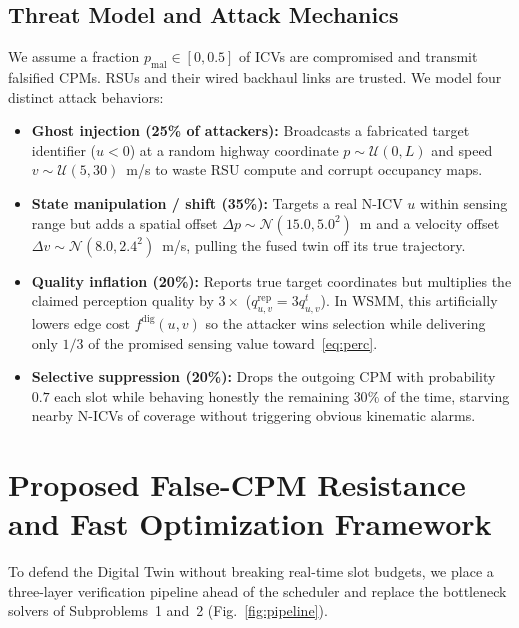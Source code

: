 \documentclass[conference]{IEEEtran}
\begin{document}
\subsection{Threat Model and Attack Mechanics}
\label{sec:threat}
We assume a fraction $p_{\mathrm{mal}}\in[0, 0.5]$ of ICVs are compromised and transmit falsified CPMs. RSUs and their wired backhaul links are trusted. We model four distinct attack behaviors:
\begin{itemize}
\item \textbf{Ghost injection (25\% of attackers):} Broadcasts a fabricated target identifier ($u < 0$) at a random highway coordinate $p\sim\mathcal{U}(0, L)$ and speed $v\sim\mathcal{U}(5, 30)$~m/s to waste RSU compute and corrupt occupancy maps.
\item \textbf{State manipulation / shift (35\%):} Targets a real N-ICV $u$ within sensing range but adds a spatial offset $\Delta p\sim\mathcal{N}(15.0, 5.0^2)$~m and a velocity offset $\Delta v\sim\mathcal{N}(8.0, 2.4^2)$~m/s, pulling the fused twin off its true trajectory.
\item \textbf{Quality inflation (20\%):} Reports true target coordinates but multiplies the claimed perception quality by $3\times$ ($q^{\mathrm{rep}}_{u,v} = 3q^t_{u,v}$). In WSMM, this artificially lowers edge cost $f^{\mathrm{dig}}(u,v)$ so the attacker wins selection while delivering only $1/3$ of the promised sensing value toward~\eqref{eq:perc}.
\item \textbf{Selective suppression (20\%):} Drops the outgoing CPM with probability $0.7$ each slot while behaving honestly the remaining $30\%$ of the time, starving nearby N-ICVs of coverage without triggering obvious kinematic alarms.
\end{itemize}

\section{Proposed False-CPM Resistance and Fast Optimization Framework}
To defend the Digital Twin without breaking real-time slot budgets, we place a three-layer verification pipeline ahead of the scheduler and replace the bottleneck solvers of Subproblems~1 and~2 (Fig.~\ref{fig:pipeline}).
\end{document}
